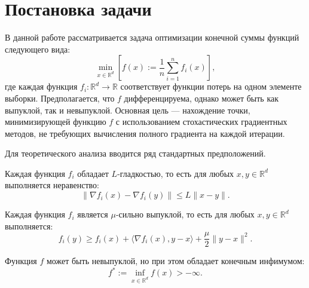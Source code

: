 \section{Постановка задачи}

    В данной работе рассматривается задача оптимизации конечной суммы функций следующего вида:
\begin{equation}\label{eq:mainproblem}
\min_{x \in \mathbb{R}^d} \left[ f(x) := \frac{1}{n} \sum_{i=1}^{n} f_i(x) \right],
\end{equation}
где каждая функция \( f_i: \mathbb{R}^d \to \mathbb{R} \) соответствует функции потерь на одном элементе выборки. Предполагается, что \( f \) дифференцируема, однако может быть как выпуклой, так и невыпуклой. Основная цель — нахождение точки, минимизирующей функцию \( f \) с использованием стохастических градиентных методов, не требующих вычисления полного градиента на каждой итерации.

Для теоретического анализа вводится ряд стандартных предположений.

\begin{assumption}\label{ass:smoothness}
Каждая функция \( f_i \) обладает \( L \)-гладкостью, то есть для любых \( x, y \in \mathbb{R}^d \) выполняется неравенство:
\[
\|\nabla f_i(x) - \nabla f_i(y)\| \leq L \|x - y\|.
\]
\end{assumption}

\begin{assumption}\label{ass:strongconvex}
Каждая функция \( f_i \) является \( \mu \)-сильно выпуклой, то есть для любых \( x, y \in \mathbb{R}^d \) выполняется:
\[
f_i(y) \geq f_i(x) + \langle \nabla f_i(x), y - x \rangle + \frac{\mu}{2} \|y - x\|^2.
\]
\end{assumption}

\begin{assumption}[Невыпуклость]\label{ass:nonconvex}
Функция \( f \) может быть невыпуклой, но при этом обладает конечным инфимумом:
\[
f^* := \inf_{x \in \mathbb{R}^d} f(x) > -\infty.
\]
\end{assumption}
